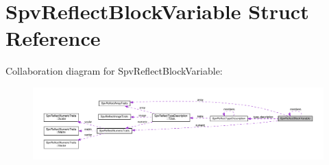 \hypertarget{structSpvReflectBlockVariable}{}\section{Spv\+Reflect\+Block\+Variable Struct Reference}
\label{structSpvReflectBlockVariable}


Collaboration diagram for Spv\+Reflect\+Block\+Variable\+:\nopagebreak
\begin{figure}[H]
\begin{center}
\leavevmode
\includegraphics[width=350pt]{structSpvReflectBlockVariable__coll__graph}
\end{center}
\end{figure}
